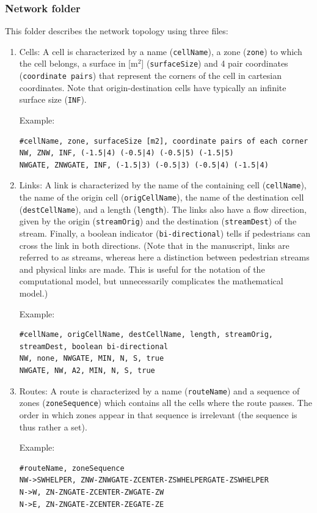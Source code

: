 \documentclass[a4paper,12pt]{article}
\begin{document}
\subsubsection{Network folder}
This folder describes the network topology using three files:
\begin{enumerate}
\item Cells: A cell is characterized by a name (\verb+cellName+), a zone (\verb+zone+) to which the cell belongs, a surface in [m$^2$] (\verb+surfaceSize+) and 4 pair coordinates (\verb+coordinate pairs+) that represent the corners of the cell in cartesian coordinates. Note that origin-destination cells have typically an infinite surface size (\verb+INF+).

Example: 
\begin{lstlisting}[breaklines]
#cellName, zone, surfaceSize [m2], coordinate pairs of each corner
NW, ZNW, INF, (-1.5|4) (-0.5|4) (-0.5|5) (-1.5|5)
NWGATE, ZNWGATE, INF, (-1.5|3) (-0.5|3) (-0.5|4) (-1.5|4)
\end{lstlisting}

\item Links: A link is characterized by the name of the containing cell (\verb+cellName+), the name of the origin cell (\verb+origCellName+), the name of the destination cell (\verb+destCellName+), and a length (\verb+length+). The links also have a flow direction, given by the origin (\verb+streamOrig+) and the destination (\verb+streamDest+) of the stream. Finally, a boolean indicator (\verb+bi-directional+) tells if pedestrians can cross the link in both directions. (Note that in the manuscript, links are referred to as streams, whereas here a distinction between pedestrian streams and physical links are made. This is useful for the notation of the computational model, but unnecessarily complicates the mathematical model.)

Example:
\begin{lstlisting}[breaklines]
#cellName, origCellName, destCellName, length, streamOrig, streamDest, boolean bi-directional
NW, none, NWGATE, MIN, N, S, true
NWGATE, NW, A2, MIN, N, S, true
\end{lstlisting}

\item Routes: A route is characterized by a name (\verb+routeName+) and a sequence of zones (\verb+zoneSequence+) which contains all the cells where the route passes. The order in which zones appear in that sequence is irrelevant (the sequence is thus rather a set).

Example: 
\begin{lstlisting}[breaklines]
#routeName, zoneSequence
NW->SWHELPER, ZNW-ZNWGATE-ZCENTER-ZSWHELPERGATE-ZSWHELPER
N->W, ZN-ZNGATE-ZCENTER-ZWGATE-ZW
N->E, ZN-ZNGATE-ZCENTER-ZEGATE-ZE
\end{lstlisting}
\end{enumerate}
\end{document}
